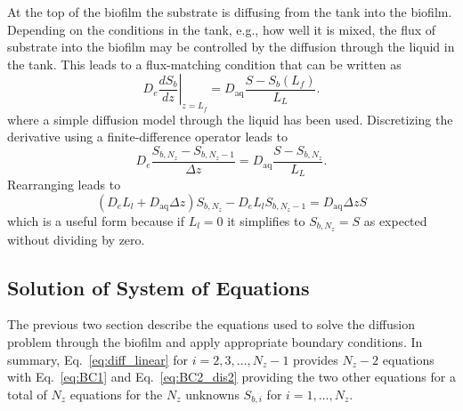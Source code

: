 \documentclass[letterpaper, twoside]{article}
\numberwithin{equation}{section}
\newcommand{\eg}{e.g.}
\begin{document}
At the top of the biofilm the substrate is diffusing from the tank into the biofilm.  Depending on the conditions in the tank, \eg, how well it is mixed, the flux of substrate into the biofilm may be controlled by the diffusion through the liquid in the tank.  This leads to a flux-matching condition that can be written as
\begin{equation}
  \label{eq:BC2}
  D_e \left.\frac{d S_b}{dz}\right|_{z=L_f} = D_{\mathrm{aq}} \frac{S - S_b(L_f)}{L_L}.
\end{equation}
where a simple diffusion model through the liquid has been used.  Discretizing the derivative using a finite-difference operator leads to
\begin{equation}
  \label{eq:BC2_dis}
  D_e \frac{S_{b,N_z} - S_{b,N_z-1}}{\Delta z} = D_{\mathrm{aq}} \frac{S - S_{b,N_z}}{L_L}.
\end{equation}
Rearranging leads to
\begin{equation}
  \label{eq:BC2_dis2}
  \left(D_e L_l + D_{\mathrm{aq}} \Delta z\right) S_{b,N_z} - D_e L_l S_{b,N_z-1} = D_{\mathrm{aq}} \Delta z S
\end{equation}
which is a useful form because if $L_l=0$ it simplifies to $S_{b,N_z}=S$ as expected without dividing by zero.

\subsection{Solution of System of Equations}
The previous two section describe the equations used to solve the diffusion problem through
the biofilm and apply appropriate boundary conditions.
In summary, Eq.~\ref{eq:diff_linear} for $i=2,3,\dots,N_z-1$ provides $N_z-2$ equations with
Eq.~\ref{eq:BC1} and Eq.~\ref{eq:BC2_dis2} providing the two other equations
for a total of $N_z$ equations for the $N_z$ unknowns $S_{b,i}$ for $i=1,\dots,N_z$.
\end{document}
